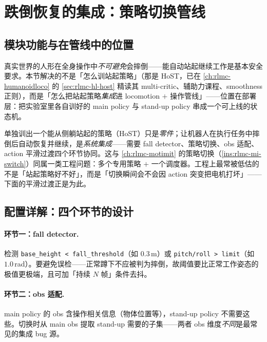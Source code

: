 \section{跌倒恢复的集成：策略切换管线}\label{sec:rlmc-wbc-recovery}

\subsection{模块功能与在管线中的位置}
真实世界的人形在全身操作中\emph{不可避免}会摔倒——能自动站起继续工作是基本安全要求。本节解决的不是「怎么训站起策略」（那是 HoST，已在 \cref{ch:rlmc-humanoidloco} 的 \cref{sec:rlmc-hl-host} 精读其 multi-critic、辅助力课程、smoothness 正则），而是「怎么把站起策略\emph{集成}进 locomotion $+$ 操作管线」——位置在部署层：把实验室里各自训好的 main policy 与 stand-up policy 串成一个可上线的状态机。

\begin{insight}[跌倒恢复是「系统」问题，不是「策略」问题]\label{ins:rlmc-wbc-system}
单独训出一个能从侧躺站起的策略（HoST）只是\emph{零件}；让机器人在执行任务中摔倒后自动恢复并继续，是\emph{系统集成}——需要 fall detector、策略切换、obs 适配、action 平滑过渡四个环节协同。这与 \cref{ch:rlmc-motimit} 的策略切换（\cref{ins:rlmc-mi-switch}）同属一类工程问题：多个专用策略 $+$ 一个调度器。工程上最常被低估的不是「站起策略好不好」，而是「切换瞬间会不会因 action 突变把电机打坏」——下面的平滑过渡正是为此。
\end{insight}

\subsection{配置详解：四个环节的设计}

\paragraph{环节一：fall detector.}
检测 \verb|base_height < fall_threshold|（如 $0.3$\,m）或 \verb|pitch/roll > limit|（如 $1.0$\,rad）。要避免误检——正常蹲下不应被判为摔倒，故阈值要比正常工作姿态的极值更极端，且可加「持续 $N$ 帧」条件去抖。

\paragraph{环节二：obs 适配.}
main policy 的 obs 含操作相关信息（物体位置等），stand-up policy 不需要这些。切换时从 main obs 提取 stand-up 需要的子集——两者 obs 维度\emph{不同}是最常见的集成 bug 源。

